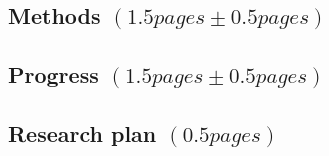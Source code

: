 \documentclass[rmp,nofootinbib,superscriptaddress,12pt,tightenlines,notitlepage]{revtex4-1}
\begin{document}
  

\subsection{Methods $\left(1.5 pages \pm 0.5 pages\right)$}

\subsection{Progress $\left(1.5 pages \pm 0.5 pages\right)$}

\subsection{Research plan $\left(0.5 pages\right)$}



\end{document}
